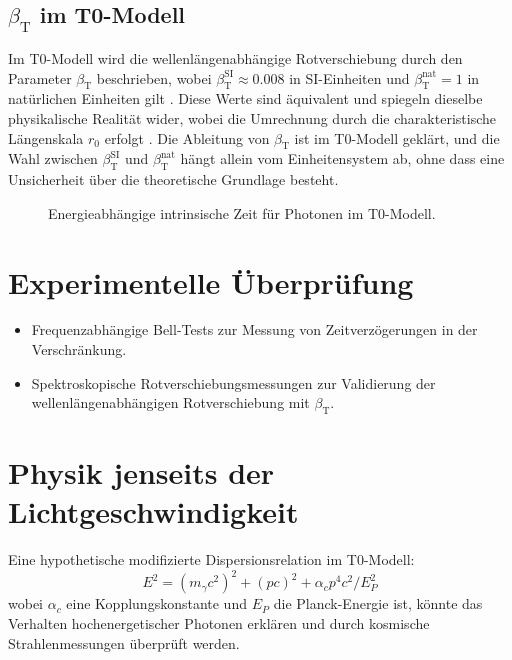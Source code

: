 \documentclass[12pt,a4paper]{article}
\newcommand{\betaT}{\beta_{\text{T}}}
\begin{document}
	\subsection{\(\betaT\) im T0-Modell}
	Im T0-Modell wird die wellenlängenabhängige Rotverschiebung durch den Parameter \(\betaT\) beschrieben, wobei \(\betaT^{\text{SI}} \approx 0.008\) in SI-Einheiten und \(\betaT^{\text{nat}} = 1\) in natürlichen Einheiten gilt \cite{pascher_params_2025}. Diese Werte sind äquivalent und spiegeln dieselbe physikalische Realität wider, wobei die Umrechnung durch die charakteristische Längenskala \(r_0\) erfolgt \cite{pascher_temp_2025}. Die Ableitung von \(\betaT\) ist im T0-Modell geklärt, und die Wahl zwischen \(\betaT^{\text{SI}}\) und \(\betaT^{\text{nat}}\) hängt allein vom Einheitensystem ab, ohne dass eine Unsicherheit über die theoretische Grundlage besteht.
	
	\begin{figure}[h]
		\centering
		\caption{Energieabhängige intrinsische Zeit für Photonen im T0-Modell.}
	\end{figure}
	
	\section{Experimentelle Überprüfung}
	\begin{itemize}
		\item Frequenzabhängige Bell-Tests zur Messung von Zeitverzögerungen in der Verschränkung.
		\item Spektroskopische Rotverschiebungsmessungen zur Validierung der wellenlängenabhängigen Rotverschiebung mit \(\betaT\).
	\end{itemize}
	
	\section{Physik jenseits der Lichtgeschwindigkeit}
	Eine hypothetische modifizierte Dispersionsrelation im T0-Modell:
	\begin{equation}
		E^2 = (m_\gamma c^2)^2 + (p c)^2 + \alpha_c p^4 c^2 / E_P^2
	\end{equation}
	wobei \(\alpha_c\) eine Kopplungskonstante und \(E_P\) die Planck-Energie ist, könnte das Verhalten hochenergetischer Photonen erklären und durch kosmische Strahlenmessungen überprüft werden.
	
\end{document}
